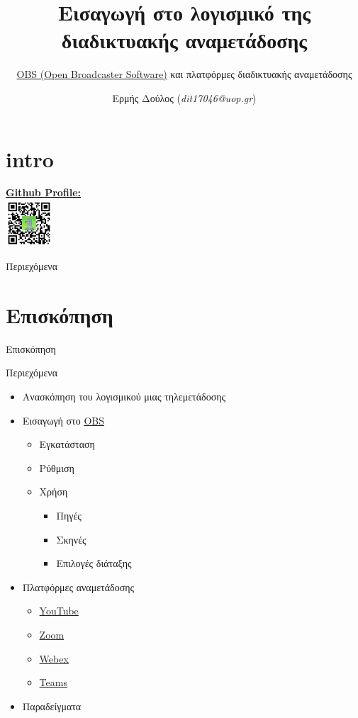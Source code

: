\documentclass[aspectratio=169]{beamer}
\title{Εισαγωγή στο λογισμικό της διαδικτυακής αναμετάδοσης}
\subtitle{\href{https://obsproject.com/}{OBS (Open Broadcaster Software)} και πλατφόρμες διαδικτυακής αναμετάδοσης}
\author{Ερμής Δούλος (\textit{dit17046@uop.gr})}
\begin{document}
\section{intro}
\begin{frame}
  \titlepage
  \begin{center}
    \href{https://github.com/doblador42}{\textbf{Github Profile:}}\\
    \includegraphics[width=0.13\textwidth]{images/qrcode.png}
  \end{center}
\end{frame}
\begin{frame}{Περιεχόμενα}
  \tableofcontents
\end{frame}

\section{Επισκόπηση}
\begin{frame}{Επισκόπηση}
  \begin{block}{Περιεχόμενα}
    \begin{itemize}
      \item Ανασκόπηση του λογισμικού μιας τηλεμετάδοσης
      \item Εισαγωγή στο \href{https://obsproject.com/}{OBS}
            \begin{itemize}
              \item Εγκατάσταση
              \item Ρύθμιση
              \item Χρήση
                    \begin{itemize}
                      \item Πηγές
                      \item Σκηνές
                      \item Επιλογές διάταξης
                    \end{itemize}
            \end{itemize}
      \item Πλατφόρμες αναμετάδοσης
            \begin{itemize}
              \item \href{https://www.youtube.com/}{YouTube}
              \item \href{https://zoom.us/}{Zoom}
              \item \href{https://www.webex.com/}{Webex}
              \item \href{https://www.microsoft.com/el-gr/microsoft-teams/group-chat-software}{Teams}
            \end{itemize}
      \item Παραδείγματα
    \end{itemize}
  \end{block}
\end{frame}
\end{document}
